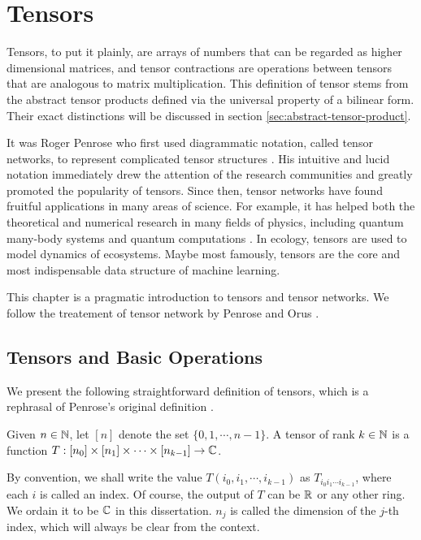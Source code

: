 \chapter{Tensors} \label{ch:tensors}

Tensors, to put it plainly, are arrays of numbers that can be regarded as higher dimensional matrices, and tensor contractions are operations between tensors that are analogous to matrix multiplication. 
This definition of tensor stems from the abstract tensor products defined via the universal property of a bilinear form. 
Their exact distinctions will be discussed in section \ref{sec:abstract-tensor-product}.

It was Roger Penrose who first used diagrammatic notation, called tensor networks, to represent complicated tensor structures \cite{penrose1971applications}. 
His intuitive and lucid notation immediately drew the attention of the research communities and greatly promoted the popularity of tensors.
Since then, tensor networks have found fruitful applications in many areas of science.
For example, it has helped both the theoretical and numerical research in many fields of physics, including quantum many-body systems and quantum computations \cite{orus2014}. 
In ecology, tensors are used to model dynamics of ecosystems. 
Maybe most famously, tensors are the core and most indispensable data structure of machine learning. 

This chapter is a pragmatic introduction to tensors and tensor networks. 
We follow the treatement of tensor network by Penrose \cite{penrose1971applications} and Orus \cite{orus2014}. 

\section{Tensors and Basic Operations}

We present the following straightforward definition of tensors, which is a rephrasal of Penrose's original definition \cite{penrose1971applications}.

\begin{definition}\label{def:tensor}
Given $n\in \mathbb{N}$, let $[n]$ denote the set $\{0, 1, \cdots, n-1\}$. 
A tensor of rank $k \in \mathbb{N}$ is a function $T : [n_0] \times [n_1] \times \cdots \times [n_{k-1}] \rightarrow \mathbb{C}$.
\end{definition}

By convention, we shall write the value $T(i_0, i_1, \cdots, i_{k-1})$ as $T_{i_0 i_1 \cdots i_{k-1}}$, where each $i$ is called an index.
Of course, the output of $T$ can be $\mathbb{R}$ or any other ring. 
We ordain it to be $\mathbb{C}$ in this dissertation.
$n_j$ is called the dimension of the $j$-th index, which will always be clear from the context.

